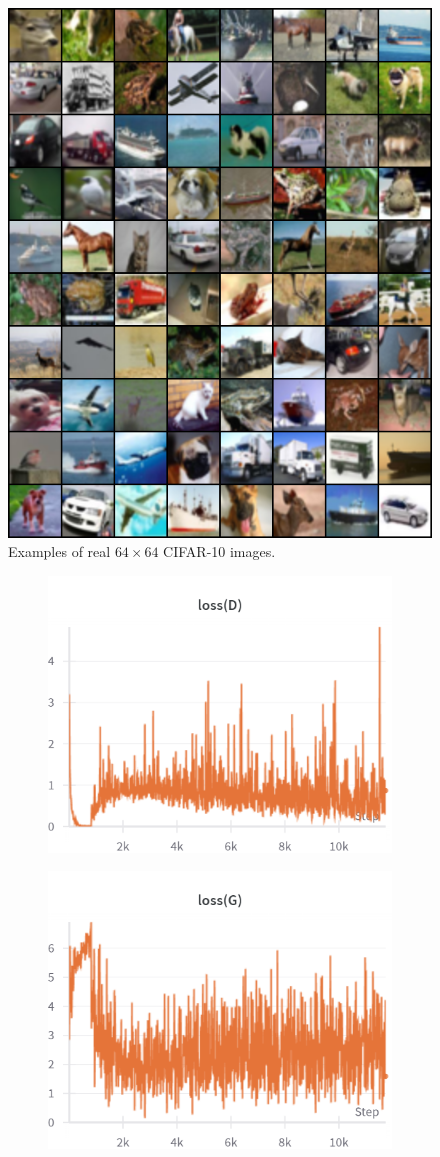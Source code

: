 \begin{figure}[H]
    \centering
    \includegraphics[width=0.2\linewidth]{cifar10/64_nz100/real_sample_epoch_0030.png}
    \caption{Examples of real $64 \times 64$ CIFAR-10 images.}
    \label{fig:cifar10_64_nz100_real}
\end{figure}%

\begin{figure}[H]
    \centering

    \begin{subfigure}{0.45\textwidth}
        \centering
        \includegraphics[width=0.95\linewidth]{cifar10/64_nz100/lossD.png}
        \caption{}
        \label{subfig:cifar10/64_nz100/lossD}
    \end{subfigure}%
    \begin{subfigure}{0.45\textwidth}
        \centering
        \includegraphics[width=0.95\linewidth]{cifar10/64_nz100/lossG.png}
        \caption{}
        \label{subfig:cifar10/64_nz100/lossG}
    \end{subfigure}


\end{figure}
